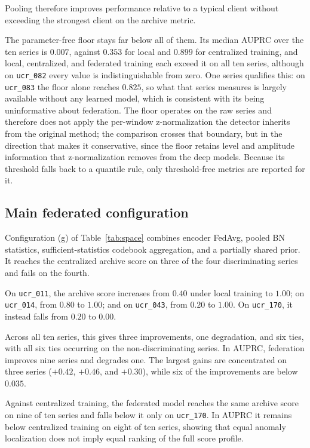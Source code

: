 \documentclass[conference]{IEEEtran}
\begin{document}
Pooling therefore improves performance relative to a typical client without exceeding the strongest client on the archive metric.

The parameter-free floor stays far below all of them. Its median AUPRC over the ten series is $0.007$, against $0.353$ for local and $0.899$ for centralized training, and local, centralized, and federated training each exceed it on all ten series, although on \texttt{ucr\_082} every value is indistinguishable from zero. One series qualifies this: on \texttt{ucr\_083} the floor alone reaches $0.825$, so what that series measures is largely available without any learned model, which is consistent with its being uninformative about federation. The floor operates on the raw series and therefore does not apply the per-window z-normalization the detector inherits from the original method; the comparison crosses that boundary, but in the direction that makes it conservative, since the floor retains level and amplitude information that z-normalization removes from the deep models. Because its threshold falls back to a quantile rule, only threshold-free metrics are reported for it.

\subsection{Main federated configuration}
\label{subsec:main}

Configuration (g) of Table~\ref{tab:space} combines encoder FedAvg, pooled BN statistics, sufficient-statistics codebook aggregation, and a partially shared prior. It reaches the centralized archive score on three of the four discriminating series and fails on the fourth.

On \texttt{ucr\_011}, the archive score increases from $0.40$ under local training to $1.00$; on \texttt{ucr\_014}, from $0.80$ to $1.00$; and on \texttt{ucr\_043}, from $0.20$ to $1.00$. On \texttt{ucr\_170}, it instead falls from $0.20$ to $0.00$.

Across all ten series, this gives three improvements, one degradation, and six ties, with all six ties occurring on the non-discriminating series. In AUPRC, federation improves nine series and degrades one. The largest gains are concentrated on three series ($+0.42$, $+0.46$, and $+0.30$), while six of the improvements are below $0.035$.

Against centralized training, the federated model reaches the same archive score on nine of ten series and falls below it only on \texttt{ucr\_170}. In AUPRC it remains below centralized training on eight of ten series, showing that equal anomaly localization does not imply equal ranking of the full score profile.
\end{document}
